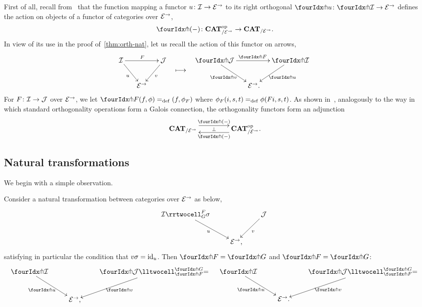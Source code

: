 \documentclass[reqno,10pt,a4paper,oneside,draft]{amsart}
\begin{document}
First of all, recall from~\cite{garner:small-object-argument} that the function mapping a functor $u \colon \mathcal{I} \to \mathcal{E}^\to$ to its right orthogonal $\liftr{u} \co \liftr{\cal{I}} \to \catE^\to$ defines the action on objects of a functor of categories over $\mathcal{E}^\to$, 
\[
  \liftr{\brarghole} \co \CAT_{/\catE^\to}^{\op} \to \CAT_{/\catE^\to} \rlap{.}
\]
In view of its use in the proof of~\cref{thm:orth-nat}, let us recall the action of this functor on arrows, 
\[
\begin{aligned}
\xymatrix@C-1em{
  \cal{I}
  \ar[dr]_{u}
  \ar[rr]^{F}
&&
  \cal{J}
  \ar[dl]^{v}
\\&
  \catE^\to
}
&&
\xymatrix{
  \ar@{}[d]|{\textstyle\longmapsto} \\
  {}
}
&&
\xymatrix@C-1em{
  \liftr{\cal{J}}
  \ar[dr]_{\liftr{v}}
  \ar[rr]^{\liftr{F}}
&&
  \liftr{\cal{I}}
  \ar[dl]^{\liftr{u}}
\\&
  \catE^\to \rlap{.}
}
\end{aligned}
\]
For $F \colon \mathcal{I} \to \mathcal{J}$ over $\mathcal{E}^\to$, we let $\liftr{F}(f,\phi) \defeq (f, \phi_F)$ where $\phi_F(i, s, t) =_{\operatorname{def}} \phi(Fi, s, t)$.
As shown in~\cite[Proposition~3.8]{garner:small-object-argument}, analogously to the way in which standard orthogonality operations form a Galois connection, the orthogonality functors form an adjunction
\begin{equation} \label{garner-adjunction}
\begin{gathered}
\xymatrix@C+2em{
  \CAT_{/\catE^\to}
  \ar@<5pt>[r]^-{\liftl{\brarghole}}
  \ar@{}[r]|-{\bot}
&
  \CAT_{/\catE^\to}^{\op} \rlap{.}
  \ar@<5pt>[l]^-{\liftr{\brarghole}}
}
\end{gathered}
\end{equation}

\subsection*{Natural transformations}

We begin with a simple observation.

\begin{proposition} \label{thm:orth-nat}
Consider a natural transformation between categories over $\mathcal{E}^\to$ as below,
\[
\xymatrix{
  \cal{I}
  \rrtwocell_G^F{\sigma}
 \ar[dr]_{u}
&&
  \cal{J}
  \ar[dl]^{v}
\\&
  \catE^\to
\rlap{,}}
\]
satisfying in particular the condition that $v \sigma = \operatorname{id}_u$.
Then $\liftr{F} = \liftr{G}$ and $\liftl{F} = \liftl{G}$:
\begin{align*}
\xymatrix{
  \liftr{\cal{I}}
  \ar[dr]_{\liftr{u}}
&&
  \liftr{\cal{J}}
  \lltwocell_{\liftr{F}}^{\liftr{G}}{=}
  \ar[dl]^{\liftr{v}}
\\&
  \catE^\to
\rlap{,}}
&&
\xymatrix{
  \liftl{\cal{I}}
  \ar[dr]_{\liftl{u}}
&&
  \liftl{\cal{J}}
  \lltwocell_{\liftl{F}}^{\liftl{G}}{=}
  \ar[dl]^{\liftl{v}}
\\&
  \catE^\to
\rlap{.}}
\end{align*}
\end{proposition}
\end{document}
